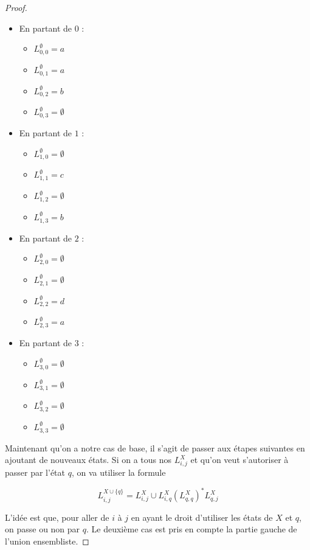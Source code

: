 \begin{proof}
\begin{itemize}
\item En partant de $0$ :
   \begin{itemize}
	 \item $L_{0,0}^{\emptyset} = a$
	 \item $L_{0,1}^{\emptyset} = a$
	 \item $L_{0,2}^{\emptyset} = b$
	 \item $L_{0,3}^{\emptyset} = \emptyset$
   \end{itemize}
\item En partant de $1$ :
   \begin{itemize}
	 \item $L_{1,0}^{\emptyset} = \emptyset$
	 \item $L_{1,1}^{\emptyset} = c$
	 \item $L_{1,2}^{\emptyset} = \emptyset$
	 \item $L_{1,3}^{\emptyset} = b$
   \end{itemize}
\item En partant de $2$ :
   \begin{itemize}
	 \item $L_{2,0}^{\emptyset} = \emptyset$
	 \item $L_{2,1}^{\emptyset} = \emptyset$
	 \item $L_{2,2}^{\emptyset} = d$
	 \item $L_{2,3}^{\emptyset} = a$
   \end{itemize}
\item En partant de $3$ :
   \begin{itemize}
	 \item $L_{3,0}^{\emptyset} = \emptyset$
	 \item $L_{3,1}^{\emptyset} = \emptyset$
	 \item $L_{3,2}^{\emptyset} = \emptyset$
	 \item $L_{3,3}^{\emptyset} = \emptyset$
   \end{itemize}
\end{itemize}

Maintenant qu'on a notre cas de base, il s'agit de passer aux étapes suivantes en ajoutant de nouveaux états. Si on a tous nos $L_{i,j}^X$ et qu'on veut s'autoriser à passer par l'état $q$, on va utiliser la formule 

\[
L_{i,j}^{X \cup \{q\}} = L_{i,j}^X \cup L_{i,q}^X(L_{q,q}^X)^*L_{q,j}^X
\]

L'idée est que, pour aller de $i$ à $j$ en ayant le droit d'utiliser les états de $X$ et $q$, on passe ou non par $q$. Le deuxième cas est pris en compte la partie gauche de l'union ensembliste.


\end{proof}
